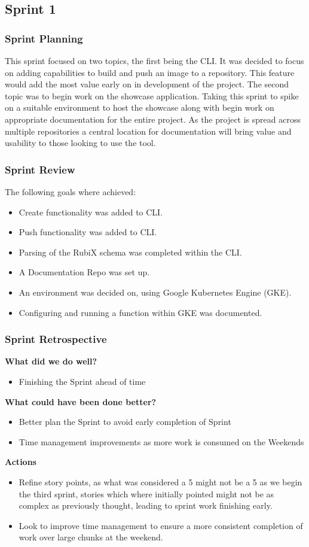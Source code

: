 \subsection{Sprint 1}
\subsubsection{Sprint Planning}
This sprint focused on two topics, the first being the CLI. It was decided to focus on adding capabilities to build and push an image to a repository. This feature would add the most value early on in development of the project. The second topic was to begin work on the showcase application. Taking this sprint to spike on a suitable environment to host the showcase along with begin work on appropriate documentation for the entire project. As the project is spread across multiple repositories a central location for documentation will bring value and usability to those looking to use the tool.
\subsubsection{Sprint Review}
The following goals where achieved:
\begin{itemize}
    \item Create functionality was added to CLI.
    \item Push functionality was added to CLI.
    \item Parsing of the RubiX schema was completed within the CLI.
    \item A Documentation Repo was set up.
    \item An environment was decided on, using Google Kubernetes Engine (GKE).
    \item Configuring and running a function within GKE was documented.
\end{itemize}
\subsubsection{Sprint Retrospective}
\textbf{What did we do well?}
\begin{itemize}
    \item Finishing the Sprint ahead of time
\end{itemize}
\textbf{What could have been done better?}
\begin{itemize}
    \item Better plan the Sprint to avoid early completion of Sprint
    \item Time management improvements as more work is consumed on the Weekends
\end{itemize}
\textbf{Actions}
\begin{itemize}
    \item Refine story points, as what was considered a 5 might not be a 5 as we begin the third sprint, stories which where initially pointed might not be as complex as previously thought, leading to sprint work finishing early.
    \item Look to improve time management to ensure a more consistent completion of work over large chunks at the weekend.
\end{itemize}
\clearpage

